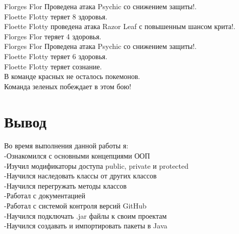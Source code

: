 \noindent Florges Flor Проведена атака Psychic со снижением защиты!.  \\
Floette Flotty теряет 8 здоровья. \\

\noindent Floette Flotty проведена атака Razor Leaf с повышенным шансом крита!. \\
Florges Flor теряет 4 здоровья. \\

\noindent Florges Flor Проведена атака Psychic со снижением защиты!. \\
Floette Flotty теряет 6 здоровья. \\
Floette Flotty теряет сознание. \\
В команде красных не осталось покемонов. \\
Команда зеленых побеждает в этом бою! \\
\section{Вывод}
Во время выполнения данной работы я: \\
-Ознакомился с основными концепциями ООП \\
-Изучил модификаторы доступа public, private и protected \\
-Научился наследовать классы от других классов \\
-Научился перегружать методы классов \\
-Работал с документацией \\
-Работал с системой контроля версий GitHub \\
-Научился подключать .jar файлы к своим проектам \\
-Научился создавать и импортировать пакеты в Java

